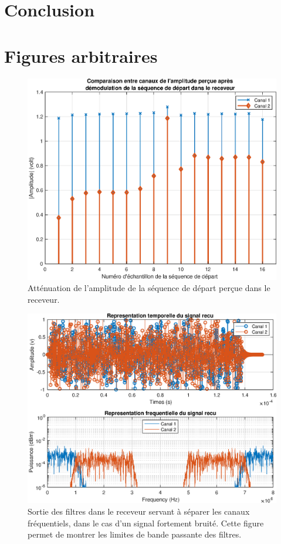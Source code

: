 \documentclass[10pt, oneside, a4paper]{article}
\begin{document}
\section*{Conclusion}

\appendix
\clearpage

\section{Figures arbitraires}
\label{sec:uncommented-figure}

\begin{figure}[!h]
    \centering
    \includegraphics[height=0.4\textheight]{eps/startSeq-comparaison.eps}
    \caption{Atténuation de l'amplitude de la séquence de départ perçue
             dans le receveur.}
\end{figure}
\vfill
\begin{figure}[!h]
    \centering
    \includegraphics[height=0.4\textheight]{eps/noised.eps}
    \caption{Sortie des filtres dans le receveur servant à séparer les canaux
             fréquentiels, dans le cas d'un signal fortement bruité.
             Cette figure permet de montrer les limites de bande passante des
             filtres.}
\end{figure}
\clearpage
\end{document}
